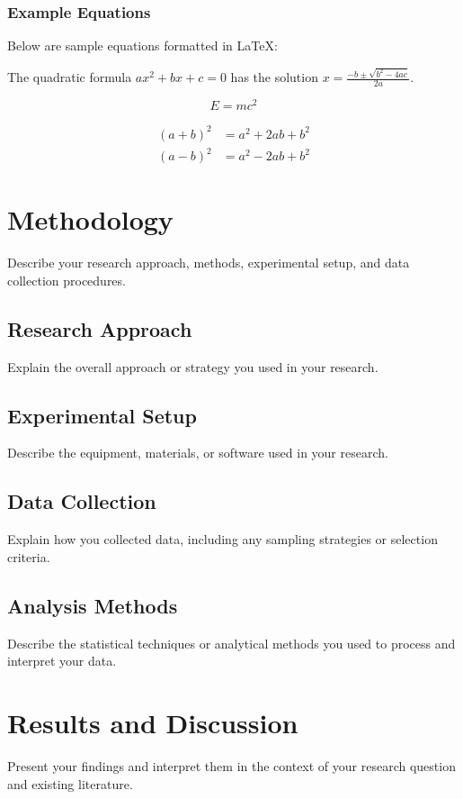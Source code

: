 \subsection{Example Equations}
Below are sample equations formatted in LaTeX:

The quadratic formula $ax^2 + bx + c = 0$ has the solution $x = \frac{-b \pm \sqrt{b^2 - 4ac}}{2a}$.

\begin{equation}
    E = mc^2
\end{equation}

\begin{align}
    (a+b)^2 & = a^2 + 2ab + b^2 \\
    (a-b)^2 & = a^2 - 2ab + b^2
\end{align}

\chapter{Methodology}
Describe your research approach, methods, experimental setup, and data collection procedures.

\section{Research Approach}
Explain the overall approach or strategy you used in your research.

\section{Experimental Setup}
Describe the equipment, materials, or software used in your research.

\section{Data Collection}
Explain how you collected data, including any sampling strategies or selection criteria.

\section{Analysis Methods}
Describe the statistical techniques or analytical methods you used to process and interpret your data.

\chapter{Results and Discussion}
Present your findings and interpret them in the context of your research question and existing literature.

